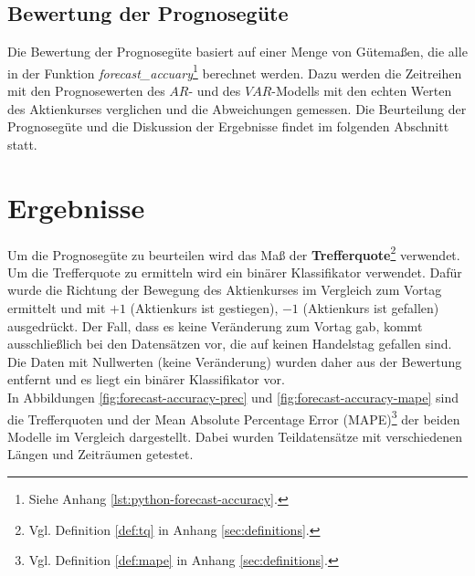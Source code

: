 \documentclass[
	a4paper,
	12pt,
	bibliography=totocnumbered,
	twoside,
]{scrreprt}
\begin{document}
\subsection*{Bewertung der Prognosegüte}
Die Bewertung der Prognosegüte basiert auf einer Menge von Gütemaßen, die alle in der Funktion \textit{forecast\_accuary}\footnote{Siehe Anhang \ref{lst:python-forecast-accuracy}.} berechnet werden. Dazu werden die Zeitreihen mit den Prognosewerten des $AR$- und des $VAR$-Modells mit den echten Werten des Aktienkurses verglichen und die Abweichungen gemessen. Die Beurteilung der Prognosegüte und die Diskussion der Ergebnisse findet im folgenden Abschnitt statt.\\


\section{Ergebnisse}
Um die Prognosegüte zu beurteilen wird das Maß der \textbf{Trefferquote}\footnote{Vgl. Definition \ref{def:tq} in Anhang \ref{sec:definitions}.} verwendet. Um die Trefferquote zu ermitteln wird ein binärer Klassifikator verwendet. Dafür wurde die Richtung der Bewegung des Aktienkurses im Vergleich zum Vortag ermittelt und mit $+1$ (Aktienkurs ist gestiegen), $-1$ (Aktienkurs ist gefallen) ausgedrückt. Der Fall, dass es keine Veränderung zum Vortag gab, kommt ausschließlich bei den Datensätzen vor, die auf keinen Handelstag gefallen sind. Die Daten mit Nullwerten (keine Veränderung) wurden daher aus der Bewertung entfernt und es liegt ein binärer Klassifikator vor.\\

In Abbildungen \ref{fig:forecast-accuracy-prec} und \ref{fig:forecast-accuracy-mape} sind die Trefferquoten und der Mean Absolute Percentage Error (MAPE)\footnote{Vgl. Definition \ref{def:mape} in Anhang \ref{sec:definitions}.} der beiden Modelle im Vergleich dargestellt. Dabei wurden Teildatensätze mit verschiedenen Längen und Zeiträumen getestet.

\end{document}
